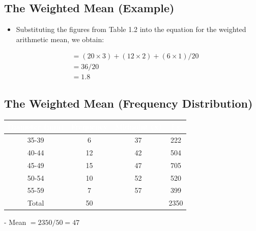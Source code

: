 \documentclass[]{article}
\providecommand{\tightlist}{%
  \setlength{\itemsep}{0pt}\setlength{\parskip}{0pt}}
\begin{document}
\hypertarget{the-weighted-mean-example-1}{%
\subsection{The Weighted Mean
(Example)}\label{the-weighted-mean-example-1}}

\begin{itemize}
\tightlist
\item
  Substituting the figures from Table 1.2 into the equation for the
  weighted arithmetic mean, we obtain:
\end{itemize}

\[\begin{aligned} &= (20 \times 3) + (12 \times 2) + (6 \times 1) / 20 \\ &= 36/20 \\ &= 1.8   \end{aligned}\]

\hypertarget{the-weighted-mean-frequency-distribution}{%
\subsection{The Weighted Mean (Frequency
Distribution)}\label{the-weighted-mean-frequency-distribution}}

\begin{table}[H]
\centering\begingroup\fontsize{20}{22}\selectfont

\begin{tabular}{c|c|c|c}
\hline
\rowcolor[HTML]{D7261E}  \begingroup\fontsize{20}{22}\selectfont \textcolor{white}{\textbf{Diameter (mm)}}\endgroup & \begingroup\fontsize{20}{22}\selectfont \textcolor{white}{\textbf{Frequency}}\endgroup & \begingroup\fontsize{20}{22}\selectfont \textcolor{white}{\textbf{Midpoint (x)}}\endgroup & \begingroup\fontsize{20}{22}\selectfont \textcolor{white}{\textbf{f.x}}\endgroup\\
\hline
35-39 & 6 & 37 & 222\\
\hline
40-44 & 12 & 42 & 504\\
\hline
45-49 & 15 & 47 & 705\\
\hline
50-54 & 10 & 52 & 520\\
\hline
55-59 & 7 & 57 & 399\\
\hline
Total & 50 &  & 2350\\
\hline
\end{tabular}
\endgroup{}
\end{table}

- Mean \(= 2350 / 50 = 47\)
\end{document}
